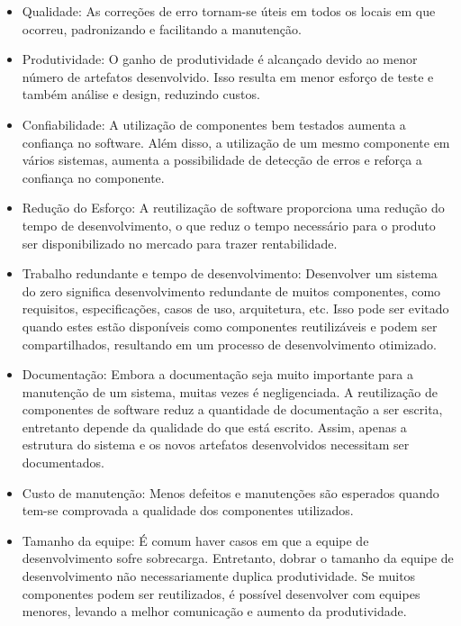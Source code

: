 \begin{itemize}

\item Qualidade: As correções de erro tornam-se úteis em todos os locais em que ocorreu, padronizando e facilitando a manutenção.

\item Produtividade: O ganho de produtividade é alcançado devido ao menor número de artefatos desenvolvido. Isso resulta em menor esforço de teste e também análise e design, reduzindo custos.

\item Confiabilidade: A utilização de componentes bem testados aumenta a
confiança no software. Além disso, a utilização de um mesmo componente em vários sistemas, aumenta a possibilidade de detecção de erros e reforça a confiança no componente.

\item Redução do Esforço: A reutilização de software proporciona uma redução do tempo de desenvolvimento, o que reduz o tempo necessário para o produto ser disponibilizado no mercado para trazer rentabilidade.

\item Trabalho redundante e tempo de desenvolvimento: Desenvolver um sistema do
zero significa desenvolvimento redundante de muitos componentes, como requisitos, especificações, casos de uso, arquitetura, etc. Isso pode ser evitado quando estes estão disponíveis como componentes reutilizáveis e podem ser compartilhados, resultando em um processo de desenvolvimento otimizado.

\item Documentação: Embora a documentação seja muito importante para a
manutenção de um sistema, muitas vezes é negligenciada. A reutilização de componentes de software reduz a quantidade de documentação a ser escrita, entretanto depende da qualidade do que está escrito. Assim, apenas a estrutura do sistema e os novos artefatos desenvolvidos necessitam ser documentados.

\item Custo de manutenção: Menos defeitos e manutenções são esperados quando tem-se comprovada a qualidade dos componentes utilizados.

\item Tamanho da equipe: É comum haver casos em que a equipe de desenvolvimento sofre sobrecarga. Entretanto, dobrar o tamanho da equipe de desenvolvimento não necessariamente duplica produtividade. Se muitos componentes podem ser reutilizados, é possível desenvolver com equipes menores, levando a melhor comunicação e aumento da produtividade.

\end{itemize}


